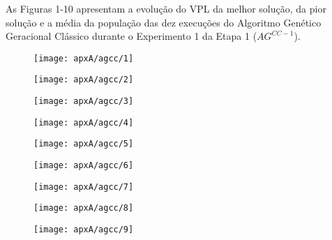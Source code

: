 
As Figuras 1-10 apresentam a evolução do VPL da melhor solução, da pior solução e a média da população das dez execuções do Algoritmo Genético Geracional Clássico durante o Experimento 1 da Etapa 1 ($AG^{CC-1}$).

\begin{figure}[H]
\centering

\texttt{[image: apxA/agcc/1]}
\end{figure}

\begin{figure}[H]
\centering

\texttt{[image: apxA/agcc/2]}
\end{figure}

\begin{figure}[H]
\centering

\texttt{[image: apxA/agcc/3]}
\end{figure}

\begin{figure}[H]
\centering

\texttt{[image: apxA/agcc/4]}
\end{figure}

\begin{figure}[htb]
\centering

\texttt{[image: apxA/agcc/5]}
\end{figure}


\begin{figure}[H]
\centering

\texttt{[image: apxA/agcc/6]}
\end{figure}

\begin{figure}[H]
\centering

\texttt{[image: apxA/agcc/7]}
\end{figure}

\begin{figure}[H]
\centering

\texttt{[image: apxA/agcc/8]}
\end{figure}

\begin{figure}[H]
\centering

\texttt{[image: apxA/agcc/9]}
\end{figure}

